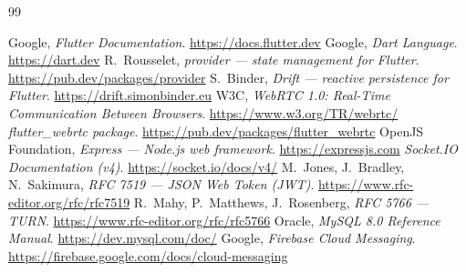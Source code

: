 \documentclass[11pt,a4paper,oneside]{report}
\begin{document}
\begin{thebibliography}{99}
     Google, \emph{Flutter Documentation}. \url{https://docs.flutter.dev}
        Google, \emph{Dart Language}. \url{https://dart.dev}
    R.\ Rousselet, \emph{provider --- state management for Flutter}. \url{https://pub.dev/packages/provider}
       S.\ Binder, \emph{Drift --- reactive persistence for Flutter}. \url{https://drift.simonbinder.eu}
      W3C, \emph{WebRTC 1.0: Real-Time Communication Between Browsers}. \url{https://www.w3.org/TR/webrtc/}
 \emph{flutter\_webrtc package}. \url{https://pub.dev/packages/flutter_webrtc}
     OpenJS Foundation, \emph{Express --- Node.js web framework}. \url{https://expressjs.com}
    \emph{Socket.IO Documentation (v4)}. \url{https://socket.io/docs/v4/}
         M.\ Jones, J.\ Bradley, N.\ Sakimura, \emph{RFC 7519 --- JSON Web Token (JWT)}. \url{https://www.rfc-editor.org/rfc/rfc7519}
        R.\ Mahy, P.\ Matthews, J.\ Rosenberg, \emph{RFC 5766 --- TURN}. \url{https://www.rfc-editor.org/rfc/rfc5766}
       Oracle, \emph{MySQL 8.0 Reference Manual}. \url{https://dev.mysql.com/doc/}
         Google, \emph{Firebase Cloud Messaging}. \url{https://firebase.google.com/docs/cloud-messaging}
\end{thebibliography}
\end{document}
